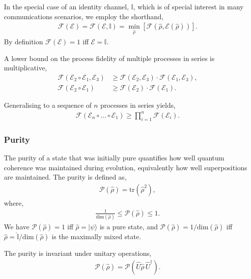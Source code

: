 \documentclass[aps,rmp,twocolumn,amsmath,amssymb,nofootinbib,superscriptaddress]{revtex4}
\newcommand{\ket}[1]{|#1\rangle}
\begin{document}
In the special case of an identity channel, $\mathbb{I}$, which is of special interest in many communications scenarios, we employ the shorthand,
\begin{align}
\mathcal{F}(\mathcal{E}) = \mathcal{F}(\mathcal{E},\mathbb{I}) = \min_{\hat\rho} \left[\mathcal{F}(\hat\rho,\mathcal{E}(\hat\rho))\right].
\end{align}
By definition \mbox{$\mathcal{F}(\mathcal{E})=1$} iff \mbox{$\mathcal{E}=\mathbb{I}$}.

A lower bound on the process fidelity of multiple processes in series is multiplicative,
\begin{align}
\mathcal{F}(\mathcal{E}_2\circ\mathcal{E}_1,\mathcal{E}_3) &\geq \mathcal{F}(\mathcal{E}_2,\mathcal{E}_3)\cdot\mathcal{F}(\mathcal{E}_1,\mathcal{E}_3), \nonumber \\
\mathcal{F}(\mathcal{E}_2\circ\mathcal{E}_1) &\geq \mathcal{F}(\mathcal{E}_2)\cdot\mathcal{F}(\mathcal{E}_1).
\end{align}

Generalising to a sequence of $n$ processes in series yields,
\begin{align}
\mathcal{F}(\mathcal{E}_n\circ\dots\circ\mathcal{E}_1) \geq \prod_{i=1}^n \mathcal{F}(\mathcal{E}_i).
\end{align}

%
%

\subsubsection{Purity}

The purity of a state that was initially pure quantifies how well quantum coherence was maintained during evolution, equivalently how well superpositions are maintained. The purity is defined as,
\begin{align}
\mathcal{P}(\hat\rho) = \mathrm{tr}(\hat\rho^2),
\end{align}
where,
\begin{align}
\frac{1}{\mathrm{dim}(\hat\rho)} \leq \mathcal{P}(\hat\rho) \leq 1.
\end{align}
We have \mbox{$\mathcal{P}(\hat\rho) = 1$} iff \mbox{$\hat\rho=\ket{\psi}$} is a pure state, and \mbox{$\mathcal{P}(\hat\rho)=1/\mathrm{dim}(\hat\rho)$} iff \mbox{$\hat\rho=\mathbb{\hat{I}}/\mathrm{dim}(\hat\rho)$} is the maximally mixed state.

The purity is invariant under unitary operations,
\begin{align}
\mathcal{P}(\hat\rho) = \mathcal{P}(\hat{U}\hat\rho\,\hat{U}^\dag).
\end{align}
\end{document}
